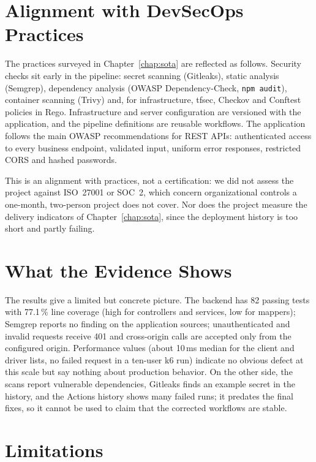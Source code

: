 \section{Alignment with DevSecOps Practices}

The practices surveyed in Chapter~\ref{chap:sota} are reflected as follows. Security checks sit early in the pipeline: secret scanning (Gitleaks), static analysis (Semgrep), dependency analysis (OWASP Dependency-Check, \texttt{npm audit}), container scanning (Trivy) and, for infrastructure, tfsec, Checkov and Conftest policies in Rego. Infrastructure and server configuration are versioned with the application, and the pipeline definitions are reusable workflows. The application follows the main OWASP recommendations for REST APIs: authenticated access to every business endpoint, validated input, uniform error responses, restricted CORS and hashed passwords.

This is an alignment with practices, not a certification: we did not assess the project against ISO~27001 or SOC~2, which concern organizational controls a one-month, two-person project does not cover. Nor does the project measure the delivery indicators of Chapter~\ref{chap:sota}, since the deployment history is too short and partly failing.

\section{What the Evidence Shows}

The results give a limited but concrete picture. The backend has 82 passing tests with 77.1\,\% line coverage (high for controllers and services, low for mappers); Semgrep reports no finding on the application sources; unauthenticated and invalid requests receive 401 and cross-origin calls are accepted only from the configured origin. Performance values (about 10\,ms median for the client and driver lists, no failed request in a ten-user k6 run) indicate no obvious defect at this scale but say nothing about production behavior. On the other side, the scans report vulnerable dependencies, Gitleaks finds an example secret in the history, and the Actions history shows many failed runs; it predates the final fixes, so it cannot be used to claim that the corrected workflows are stable.

\section{Limitations}

